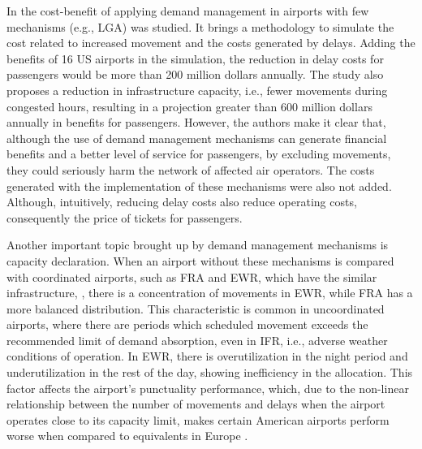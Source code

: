 In \cite{swaroop2012more} the cost-benefit of applying demand management in airports with few mechanisms (e.g., \acrshort{LGA}) was studied. It brings a methodology to simulate the cost related to increased movement and the costs generated by delays. Adding the benefits of 16 US airports in the simulation, the reduction in delay costs for passengers would be more than 200 million dollars annually. The study also proposes a reduction in infrastructure capacity, i.e., fewer movements during congested hours, resulting in a projection greater than 600 million dollars annually in benefits for passengers. However, the authors make it clear that, although the use of demand management mechanisms can generate financial benefits and a better level of service for passengers, by excluding movements, they could seriously harm the network of affected air operators. The costs generated with the implementation of these mechanisms were also not added. Although, intuitively, reducing delay costs also reduce operating costs, consequently the price of tickets for passengers.

Another important topic brought up by demand management mechanisms is capacity declaration. When an airport without these mechanisms is compared with coordinated airports, such as \acrfull{FRA} and \acrfull{EWR}, which have the similar infrastructure, , there is a concentration of movements in \acrshort{EWR}, while \acrshort{FRA} has a more balanced distribution. This characteristic is common in uncoordinated airports, where there are periods which scheduled movement exceeds the recommended limit of demand absorption, even in \acrfull{IFR}, i.e., adverse weather conditions of operation. In \acrshort{EWR}, there is overutilization in the night period and underutilization in the rest of the day, showing inefficiency in the allocation. This factor affects the airport's punctuality performance, which, due to the non-linear relationship between the number of movements and delays when the airport operates close to its capacity limit, makes certain American airports perform worse when compared to equivalents in Europe \cite{gillen2016airport}.

%

